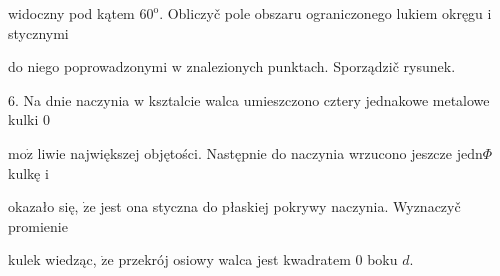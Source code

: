 \documentclass[a4paper,12pt]{article}
\begin{document}
widoczny pod kątem $60^{\mathrm{o}}$. Obliczyč pole obszaru ograniczonego lukiem okręgu $\mathrm{i}$ stycznymi

do niego poprowadzonymi $\mathrm{w}$ znalezionych punktach. Sporządzič rysunek.

6. Na dnie naczynia $\mathrm{w}$ ksztalcie walca umieszczono cztery jednakowe metalowe kulki $0$

$\mathrm{m}\mathrm{o}\dot{\mathrm{z}}$ liwie największej objętości. Następnie do naczynia wrzucono jeszcze $\mathrm{j}\mathrm{e}\mathrm{d}\mathrm{n}\Phi$ kulkę $\mathrm{i}$

okazało się, $\dot{\mathrm{z}}\mathrm{e}$ jest ona styczna do płaskiej pokrywy naczynia. Wyznaczyč promienie

kulek wiedząc, $\dot{\mathrm{z}}\mathrm{e}$ przekrój osiowy walca jest kwadratem $0$ boku $d.$
\end{document}
